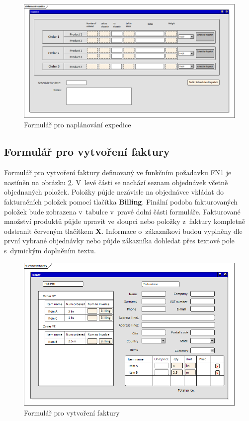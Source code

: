 \documentclass[thesis=B,czech]{FITthesis}[2012/06/26]
\begin{document}
\begin{figure}
	\includegraphics[width=\textwidth]{expedition_plan.png}
	\caption{Formulář pro naplánování expedice}\label{expedice}
\end{figure}

\subsection{Formulář pro vytvoření faktury}
	Formulář pro vytvoření faktury definovaný ve funkčním požadavku FN1 je nastíněn na obrázku \ref{faktura}. V~levé části se nachází seznam objednávek včetně objednaných položek. Položky půjde nezávisle na objednávce vkládat do fakturačních položek pomocí tlačítka \textbf{Billing}. Finální podoba fakturovaných položek bude zobrazena v~tabulce v~pravé dolní části formuláře. Fakturované množství produktů půjde upravit ve sloupci  nebo položky z~faktury kompletně odstranit červeným tlačítkem \textbf{X}. Informace o~zákazníkovi budou vyplněny dle první vybrané objednávky nebo půjde zákazníka dohledat přes textové pole s~dymickým doplněním textu.

\begin{figure}
	\includegraphics[width=\textwidth]{invoice_form.png}
	\caption{Formulář pro vytvoření faktury}\label{faktura}
\end{figure}
\end{document}
